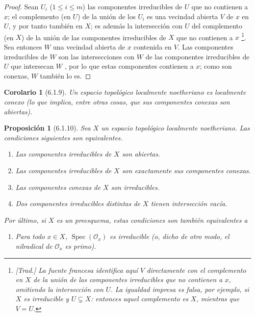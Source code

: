 \documentclass[oneside]{amsart}
\theoremstyle{ega-env-style}
\theoremstyle{ega-thm-env-style}
\newtheorem*{proposition}{Proposición}
\newtheorem*{corollary}{Corolario}
\theoremstyle{ega-defn-env-style}
\def\leq{\leqslant}                 %
\let\EGAOriginalLabel\label
\renewcommand{\label}[1]{\phantomsection\EGAOriginalLabel{#1}}
\begin{document}
\begin{proof}
Sean $U_i$ ($1\leq i\leq m$) las componentes irreducibles de $U$ que no contienen a $x$;
el complemento (en $U$) de la unión de los $U_i$ es una vecindad abierta $V$ de $x$ en $U$, y por tanto también en $X$;
es además la intersección con $U$ del complemento (en $X$) de la unión de las componentes irreducibles de $X$ que no contienen a $x$ \footnote{\emph{[Trad.] La fuente francesa identifica aquí $V$ directamente con el complemento en $X$ de la unión de las componentes irreducibles que no contienen a $x$, omitiendo la intersección con $U$. La igualdad impresa es falsa, por ejemplo, si $X$ es irreducible y $U\subsetneq X$: entonces aquel complemento es $X$, mientras que $V=U$.}}.
Sea entonces $W$ una vecindad abierta de $x$ contenida en $V$.
Las componentes irreducibles de $W$ son las intersecciones con $W$ de las componentes irreducibles de $U$ que intersecan $W$ , por lo que estas componentes contienen a $x$;
como son conexas, $W$ también lo es.
\end{proof}

\begin{corollary}[6.1.9]
\label{I.6.1.9}
Un espacio topológico localmente noetheriano es localmente conexo (lo que implica, entre otras cosas, que sus componentes conexas son abiertas).
\end{corollary}

\begin{proposition}[6.1.10]
\label{I.6.1.10}
Sea $X$ un espacio topológico localmente noetheriano.
Las condiciones siguientes son equivalentes.
\begin{enumerate}
  \item[\textup{a)}] Las componentes irreducibles de $X$ son abiertas.
  \item[\textup{b)}] Las componentes irreducibles de $X$ son exactamente sus componentes conexas.
  \item[\textup{c)}] Las componentes conexas de $X$ son irreducibles.
  \item[\textup{d)}] Dos componentes irreducibles distintas de $X$ tienen intersección vacía.
\end{enumerate}
Por último, si $X$ es un preesquema, estas condiciones son también equivalentes a
\begin{enumerate}
  \item[\textup{e)}] Para todo $x\in X$, $\operatorname{Spec}(\mathscr{O}_x)$ es irreducible (o, dicho de otro modo, el nilradical de $\mathscr{O}_x$ es primo).
\end{enumerate}
\end{proposition}
\end{document}
